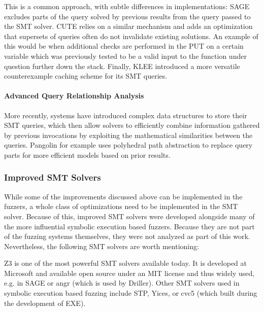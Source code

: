 \documentclass{article}
\begin{document}
\begin{multicols}{2}
    This is a common approach, with subtle differences in implementations: SAGE\cite{SAGE} excludes parts of the query solved by previous results from the query passed to the SMT solver. CUTE\cite{CUTE} relies on a similar mechanism and adds an optimization that supersets of queries often do not invalidate existing solutions. An example of this would be when additional checks are performed in the PUT on a certain variable which was previously tested to be a valid input to the function under question further down the stack. Finally, KLEE\cite{KLEE} introduced a more versatile counterexample caching scheme for its SMT queries.

    \paragraph{Advanced Query Relationship Analysis}
    More recently, systems have introduced complex data structures to store their SMT queries, which then allow solvers to efficiently combine information gathered by previous invocations by exploiting the mathematical similarities between the queries. Pangolin\cite{Pangolin} for example uses polyhedral path abstraction to replace query parts for more efficient models based on prior results.

    \subsubsection{Improved SMT Solvers}
    While some of the improvements discussed above can be implemented in the fuzzers, a whole class of optimizations need to be implemented in the SMT solver. Because of this, improved SMT solvers were developed alongside many of the more influential symbolic execution based fuzzers. Because they are not part of the fuzzing systems themselves, they were not analyzed as part of this work. Nevertheless, the following SMT solvers are worth mentioning:

    Z3\cite{Z3} is one of the most powerful SMT solvers available today. It is developed at Microsoft and available open source under an MIT license and thus widely used, e.g. in SAGE\cite{SAGE} or angr\cite{angr} (which is used by Driller\cite{Driller}). Other SMT solvers used in symbolic execution based fuzzing include STP\cite{STP}, Yices\cite{Yices}, or cvc5\cite{CVC5} (which built during the development of EXE\cite{EXE}).


\end{multicols}
\end{document}

